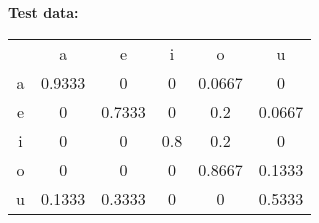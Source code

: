 \documentclass[margin=0.5in]{article}
\begin{document}
	\noindent\textbf{Test data:}\\
	\begin{tabular}{|c||c|c|c|c|c|}
		\hline
		  & a & e & i & o & u \\ \hhline{|=||=|=|=|=|=|}
		a & \cellcolor{green!25}0.9333 & 0 & 0 & 0.0667 & 0 \\ \hline
		e & 0 & \cellcolor{green!25}0.7333 & 0 & 0.2 & 0.0667 \\ \hline
		i & 0 & 0 & \cellcolor{green!25}0.8 & 0.2 & 0 \\ \hline
		o & 0 & 0 & 0 & \cellcolor{green!25}0.8667 & 0.1333 \\ \hline
		u & 0.1333 & 0.3333 & 0 & 0 & \cellcolor{green!25}0.5333 \\ \hline
	\end{tabular}
\end{document}
